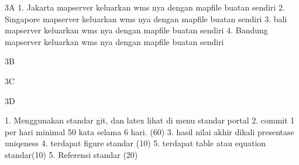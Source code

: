 3A
1. Jakarta mapserver keluarkan wms nya dengan mapfile buatan sendiri
2. Singapore mapserver keluarkan wms nya dengan mapfile buatan sendiri
3. bali mapserver keluarkan wms nya dengan mapfile buatan sendiri
4. Bandung mapserver keluarkan wms nya dengan mapfile buatan sendiri

3B


3C


3D




1. Menggunakan standar git, dan latex lihat di menu standar portal
2. commit 1 per hari minimal 50 kata selama 6 hari. (60)
3. hasil nilai akhir dikali presentase uniqeness
4. terdapat figure standar (10)
5. terdapat table atau equation standar(10)
5. Referensi standar (20)
